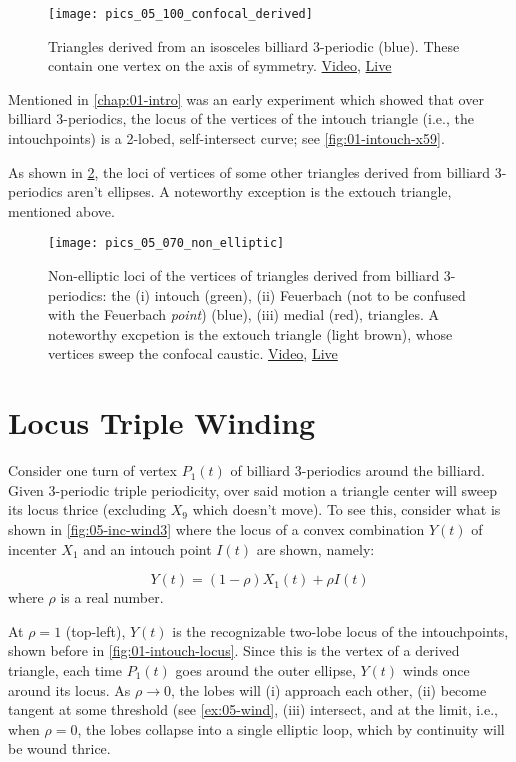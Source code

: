 \begin{figure}
    \centering
    \texttt{[image: pics\_05\_100\_confocal\_derived]}
    \caption{Triangles derived from an isosceles billiard 3-periodic (blue). These contain one vertex on the axis of symmetry. \href{https://youtu.be/xyroRTEVNDc}{Video}, \href{https://bit.ly/3fyylD0}{Live}}
    \label{fig:05-derived-isosceles}
\end{figure}

Mentioned in \cref{chap:01-intro} was an early experiment which showed that over billiard 3-periodics, the locus of the vertices of the intouch triangle (i.e., the intouchpoints) is a 2-lobed, self-intersect curve; see \cref{fig:01-intouch-x59}.

As shown in \cref{fig:05-locus-x11-x100}, the loci of vertices of some other triangles derived from billiard 3-periodics aren't ellipses. A noteworthy exception is the extouch triangle, mentioned above.

\begin{figure}
    \centering
    \texttt{[image: pics\_05\_070\_non\_elliptic]}
    \caption{Non-elliptic loci of the vertices of triangles derived from billiard 3-periodics: the (i) intouch (green), (ii) Feuerbach (not to be confused with the Feuerbach {\em point}) (blue), (iii) medial (red), triangles. A noteworthy excpetion is the extouch triangle (light brown), whose vertices sweep the confocal caustic.
     \href{https://youtu.be/OGvCQbYqJyI}{Video}, \href{https://bit.ly/3orrSxQ}{Live}}
    \label{fig:05-locus-x11-x100}
\end{figure}



\section{Locus Triple Winding}

Consider one turn of vertex $P_1(t)$ of billiard 3-periodics around the billiard. Given 3-periodic triple periodicity, over said motion a triangle center will sweep its locus thrice (excluding $X_9$ which doesn't move). To see this, consider what is shown in \cref{fig:05-inc-wind3} where the locus of a convex combination $Y(t)$ of incenter $X_1$ and an intouch point $I(t)$ are shown, namely:

\[ Y(t) = (1-\rho) X_1(t) +  \rho I(t)  \]
where $\rho$ is a real number.

At $\rho=1$ (top-left), $Y(t)$ is the recognizable two-lobe locus of the intouchpoints, shown before in \cref{fig:01-intouch-locus}. Since this is the vertex of a derived triangle, each time $P_1(t)$ goes around the outer ellipse, $Y(t)$ winds once around its locus. As  $\rho{\rightarrow}0$, the lobes will (i) approach each other, (ii) become tangent at some threshold (see \cref{ex:05-wind}, (iii) intersect, and at the limit, i.e., when $\rho=0$, the lobes collapse into a single elliptic loop, which by continuity will be wound thrice.

